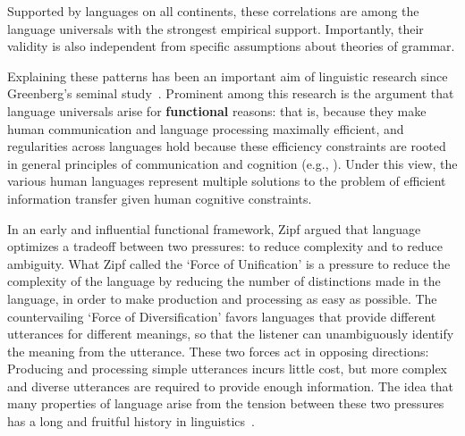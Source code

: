 \documentclass[9pt,twocolumn,twoside,lineno]{pnas-new}
\newcommand{\key}[1]{\textbf{#1}}
\begin{document}
Supported by languages on all continents, these correlations are among the language universals with the strongest empirical support.
Importantly, their validity is also independent from specific assumptions about theories of grammar.


Explaining these patterns has been an important aim of linguistic research since Greenberg's seminal study~\cite{lehmann1973structural, jackendoff1977x,frazier1985syntactic,chomsky1993theory, kayne2003antisymmetry, baker2008macroparameter, dryer1992greenbergian, hawkins1994performance}. %
Prominent among this research is the argument that
language universals arise for \key{functional} reasons: that is, because they make human communication and language processing maximally efficient, and regularities across languages hold because these efficiency constraints are rooted in general principles of communication and cognition (e.g., \cite{gabelentz1901sprachwissenschaft,zipf1949human,hockett1960origin,pinker1990natural,givon1991markedness,hawkins1994performance,hawkins2004efficiency,croft2001functional,haspelmath2008parametric,jaeger2011language,kirby2015compression}).
Under this view, the various human languages represent multiple solutions to the problem of efficient information transfer given human cognitive constraints.

In an early and  influential functional framework,
Zipf \cite{zipf1949human} argued that language optimizes a tradeoff between two pressures: to reduce complexity and to reduce ambiguity.
What Zipf called the `Force of Unification' is a pressure to reduce the complexity of the language by reducing the number of distinctions made in the language, in order to make production and processing as easy as possible.
The countervailing `Force of Diversification' favors languages that provide different utterances for different meanings, so that the listener can unambiguously identify the meaning from the utterance.
These two forces act in opposing directions:
Producing and processing simple utterances incurs little cost, but more complex and diverse utterances are required to provide enough information.
The idea that many properties of language arise from the tension between these two pressures has a long and fruitful history in linguistics~\cite{gabelentz1901sprachwissenschaft,horn1984toward,lindblom1990explaining,hawkins2004efficiency,haspelmath2008functional}. %
\end{document}
